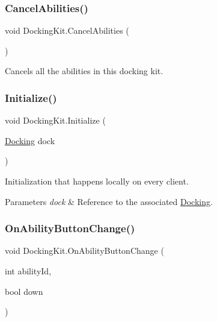 \subsubsection{\texorpdfstring{Cancel\+Abilities()}{CancelAbilities()}}
{\footnotesize\ttfamily void Docking\+Kit.\+Cancel\+Abilities (\begin{DoxyParamCaption}{ }\end{DoxyParamCaption})}



Cancels all the abilities in this docking kit. 

\hypertarget{class_docking_kit_ada18b95ce1ccac502a31a468381aab7c}{}\label{class_docking_kit_ada18b95ce1ccac502a31a468381aab7c} 
\subsubsection{\texorpdfstring{Initialize()}{Initialize()}}
{\footnotesize\ttfamily void Docking\+Kit.\+Initialize (\begin{DoxyParamCaption}\item[{\hyperlink{class_docking}{Docking}}]{dock }\end{DoxyParamCaption})}



Initialization that happens locally on every client. 


\begin{DoxyParams}{Parameters}
{\em dock} & Reference to the associated \hyperlink{class_docking}{Docking}.\\
\hline
\end{DoxyParams}
\hypertarget{class_docking_kit_a7768323bf115988fc5465746eddefec6}{}\label{class_docking_kit_a7768323bf115988fc5465746eddefec6} 
\subsubsection{\texorpdfstring{On\+Ability\+Button\+Change()}{OnAbilityButtonChange()}}
{\footnotesize\ttfamily void Docking\+Kit.\+On\+Ability\+Button\+Change (\begin{DoxyParamCaption}\item[{int}]{ability\+Id,  }\item[{bool}]{down }\end{DoxyParamCaption})}



